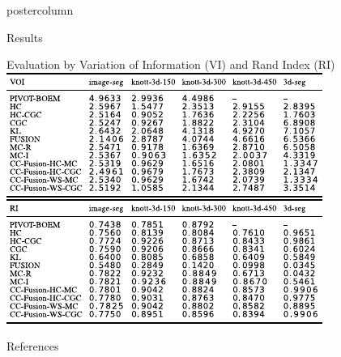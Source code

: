 \documentclass[final,hyperref={pdfpagelabels=false}]{beamer}
\begin{document}
\begin{frame}
\begin{columns}
\begin{column}{.49\textwidth}
\begin{beamercolorbox}[center,wd=\textwidth]{postercolumn}
\begin{minipage}[T]{.95\textwidth}
{\begin{block}{Results}
            \end{block}
            \vfill
            \begin{block}{Evaluation by Variation of Information (VI) and Rand Index (RI)}
              \centering
              \includegraphics[width=0.8\linewidth]{virib.pdf}            
            \end{block}
            \vfill
            \vfill
            \begin{block}{References}
                \small
                
                
            \end{block}
            \vfill
          }

\end{minipage}
\end{beamercolorbox}
\end{column}
\end{columns}
\end{frame}
\end{document}

